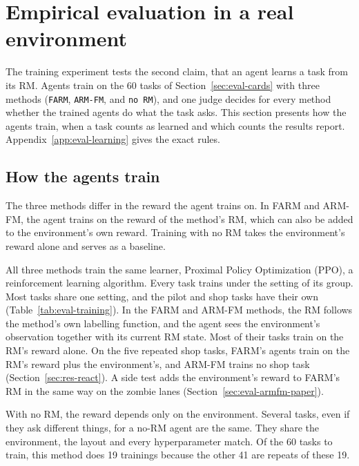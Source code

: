 \documentclass[11pt,english,listoffigures,listoftables]{tfgetsinf}
\begin{document}
\section{Empirical evaluation in a real environment}
\label{sec:eval-learning}
The training experiment tests the second claim, that an agent learns a task from its RM. Agents train on the 60 tasks of Section~\ref{sec:eval-cards} with three methods (\texttt{FARM}, \texttt{ARM-FM}, and \texttt{no RM}), and one judge decides for every method whether the trained agents do what the task asks. This section presents how the agents train, when a task counts as learned and which counts the results report. Appendix~\ref{app:eval-learning} gives the exact rules.

\subsection{How the agents train}
\label{sec:eval-training}The three methods differ in the reward the agent trains on. In FARM and ARM-FM, the agent trains on the reward of the method's RM, which can also be added to the environment's own reward. Training with no RM takes the environment's reward alone and serves as a baseline.

All three methods train the same learner, Proximal Policy Optimization (PPO), a reinforcement learning algorithm. Every task trains under the setting of its group. Most tasks share one setting, and the pilot and shop tasks have their own (Table~\ref{tab:eval-training}). In the FARM and ARM-FM methods, the RM follows the method's own labelling function, and the agent sees the environment's observation together with its current RM state. Most of their tasks train on the RM's reward alone. On the five repeated shop tasks, FARM's agents train on the RM's reward plus the environment's, and ARM-FM trains no shop task (Section~\ref{sec:res-react}). A side test adds the environment's reward to FARM's RM in the same way on the zombie lanes (Section~\ref{sec:eval-armfm-paper}).

With no RM, the reward depends only on the environment. Several tasks, even if they ask different things, for a no-RM agent are the same. They share the environment, the layout and every hyperparameter match. Of the 60 tasks to train, this method does 19 trainings because the other 41 are repeats of these 19.
\end{document}
